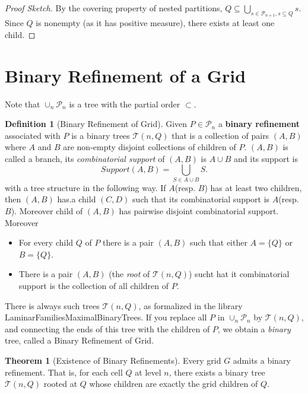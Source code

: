 \documentclass[12pt,a4paper]{article}
\theoremstyle{definition}
\newtheorem{definition}{Definition}[section]
\newtheorem{theorem}{Theorem}[section]
\begin{document}
\begin{proof}[Proof Sketch]
By the covering property of nested partitions, $Q \subseteq \bigcup_{s \in \mathcal{P}_{n+1}, s \subseteq Q} s$. Since $Q$ is nonempty (as it has positive measure), there exists at least one child.
\end{proof}

\newpage




\section{Binary Refinement of a Grid}


Note that $\cup_n \mathcal{P}_n$ is a tree with the partial order $\subset$. 


\begin{definition}[Binary Refinement of Grid] Given $P\in \mathcal{P}_n$ a  \textbf{binary refinement} associated with $P$  is a  binary trees $\mathcal{T}(n, Q)$ that is a collection of pairs $(A,B)$ where $A$ and $B$ are non-empty disjoint collections of children of $P$. $(A,B)$ is called a branch, its {\it combinatorial support} of $(A,B)$ is $A\cup B$ and its support is 
$$Support (A,B) = \bigcup_{S\in A\cup B} S.$$
 with a tree structure in the following way. If $A$(resp. $B$) has at least two children, then $(A,B)$ has.a child $(C,D)$ such that its combinatorial support is $A$(resp. $B$). Moreover child of $(A,B)$ has pairwise disjoint combinatorial support. Moreover 

\begin{itemize} 
\item[A.]  For  every child $Q$ of $P$ there is a pair $(A,B)$ such that either $A=\{Q\}$ or $B=\{Q\}$.
\item[B.] There is a pair $(A,B)$ (the {\it root} of $\mathcal{T}(n, Q)$) sucht hat it combinatorial support is the collection of all children of $P$. 
\end{itemize} 
There is always  such trees  $\mathcal{T}(n, Q)$, as formalized in the library LaminarFamiliesMaximalBinaryTrees. 
If you replace all $P$ in $\cup_n \mathcal{P}_n$  by $\mathcal{T}(n, Q)$, and connecting the ends of this tree with the children of $P$, we obtain a {\it binary} tree, called  a Binary Refinement of Grid. 
\end{definition}  
 

\begin{theorem}[Existence of Binary Refinements]
Every grid $G$ admits a binary refinement. That is, for each cell $Q$ at level $n$, there exists a binary tree $\mathcal{T}(n, Q)$ rooted at $Q$ whose children are exactly the grid children of $Q$.
\end{theorem}
\end{document}
